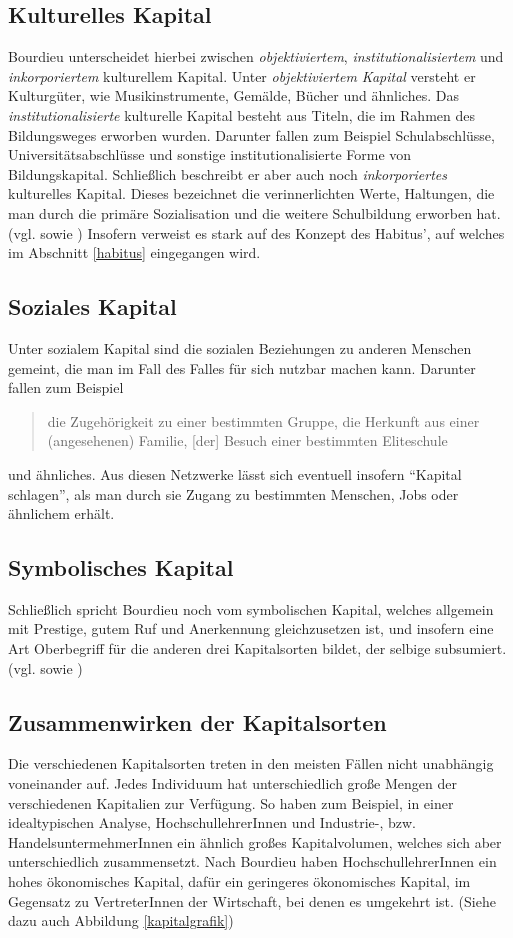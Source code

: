 \documentclass[a4paper, german, oneside]{scrbook}
\begin{document}
\subsection{Kulturelles Kapital}
Bourdieu unterscheidet hierbei zwischen \emph{objektiviertem}, \emph{institutionalisiertem} und \emph{inkorporiertem} kulturellem Kapital. Unter \emph{objektiviertem Kapital} versteht er Kulturgüter, wie Musikinstrumente, Gemälde, Bücher und ähnliches. Das \emph{institutionalisierte} kulturelle Kapital besteht aus Titeln, die im Rahmen des Bildungsweges erworben wurden. Darunter fallen zum Beispiel Schulabschlüsse, Universitätsabschlüsse und sonstige institutionalisierte Forme von Bildungskapital. Schließlich beschreibt er aber auch noch \emph{inkorporiertes} kulturelles Kapital. Dieses bezeichnet die verinnerlichten Werte, Haltungen, die man durch die primäre Sozialisation und die weitere Schulbildung erworben hat. (vgl. \cite[539f.]{joas_sozialtheorie:_2004} sowie \cite[86f.]{luthje_medium_2008}) Insofern verweist es stark auf des Konzept des Habitus', auf welches im Abschnitt \ref{habitus} eingegangen wird.

\subsection{Soziales Kapital}
Unter sozialem Kapital sind die sozialen Beziehungen zu anderen Menschen gemeint, die man im Fall des Falles für sich nutzbar machen kann. Darunter fallen zum Beispiel \blockquote[{\cite[540]{joas_sozialtheorie:_2004}}]{die Zugehörigkeit zu einer bestimmten Gruppe, die Herkunft aus einer (angesehenen) Familie, [der] Besuch einer bestimmten Eliteschule} und ähnliches. Aus diesen Netzwerke lässt sich eventuell insofern \enquote{Kapital schlagen}, als man durch sie Zugang zu bestimmten Menschen, Jobs oder ähnlichem erhält.

\subsection{Symbolisches Kapital}
Schließlich spricht Bourdieu noch vom symbolischen Kapital, welches allgemein mit Prestige, gutem Ruf und Anerkennung gleichzusetzen ist, und insofern eine Art Oberbegriff für die anderen drei Kapitalsorten bildet, der selbige subsumiert. (vgl. \cite[540]{joas_sozialtheorie:_2004} sowie \cite[87]{luthje_medium_2008})

\subsection{Zusammenwirken der Kapitalsorten}
Die verschiedenen Kapitalsorten treten in den meisten Fällen nicht unabhängig voneinander auf. Jedes Individuum hat unterschiedlich große Mengen der verschiedenen Kapitalien zur Verfügung. So haben zum Beispiel, in einer idealtypischen Analyse, HochschullehrerInnen und Industrie-, bzw. HandelsuntermehmerInnen ein ähnlich großes Kapitalvolumen, welches sich aber unterschiedlich zusammensetzt. Nach Bourdieu haben HochschullehrerInnen ein hohes ökonomisches Kapital, dafür ein geringeres ökonomisches Kapital, im Gegensatz zu VertreterInnen der Wirtschaft, bei denen es umgekehrt ist. (Siehe dazu auch Abbildung \ref{kapitalgrafik}) \parencite[vgl.][541]{joas_sozialtheorie:_2004}
\end{document}

